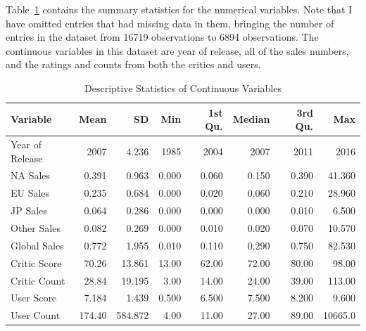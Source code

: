 \documentclass[12pt]{article}
\begin{document}
Table~\ref{tab:ds} contains the summary statistics for the numerical variables. Note that I have omitted entries that had missing data in them, bringing the number of 
entries in the dataset from 16719 observations to 6894 observations. The continuous variables in this dataset are year of release, all of the sales 
numbers, and the ratings and counts from both the critics and users.

\begin{table}[ht]
  \caption{Descriptive Statistics of Continuous Variables}
\label{tab:ds}
\centering
\begin{tabular}{lrrrrrrr}
    \hline
  Variable & Mean & SD & Min & 1st Qu. & Median & 3rd Qu. & Max \\ 
    \hline
    Year of Release & 2007 & 4.236 & 1985 & 2004 & 2007 & 2011 & 2016\\ 
    NA Sales & 0.391 & 0.963 & 0.000 & 0.060 & 0.150 & 0.390 & 41.360\\ 
    EU Sales & 0.235 & 0.684 & 0.000 & 0.020 & 0.060 & 0.210 & 28.960\\ 
    JP Sales & 0.064 & 0.286 & 0.000 & 0.000 & 0.000 & 0.010 & 6.500\\ 
    Other Sales & 0.082 & 0.269 & 0.000 & 0.010 & 0.020 & 0.070 & 10.570\\ 
    Global Sales & 0.772 & 1.955 & 0.010 & 0.110 & 0.290 & 0.750 & 82.530\\ 
    Critic Score & 70.26 & 13.861 & 13.00 & 62.00 & 72.00 & 80.00 & 98.00\\
    Critic Count & 28.84 & 19.195 & 3.00 & 14.00 & 24.00 & 39.00 & 113.00\\
    User Score & 7.184 & 1.439 & 0.500 & 6.500 & 7.500 & 8.200 & 9.600\\ 
    User Count & 174.40 & 584.872 & 4.00 & 11.00 & 27.00 & 89.00 & 10665.0\\
     \hline
  \end{tabular}
  \end{table}
\end{document}
